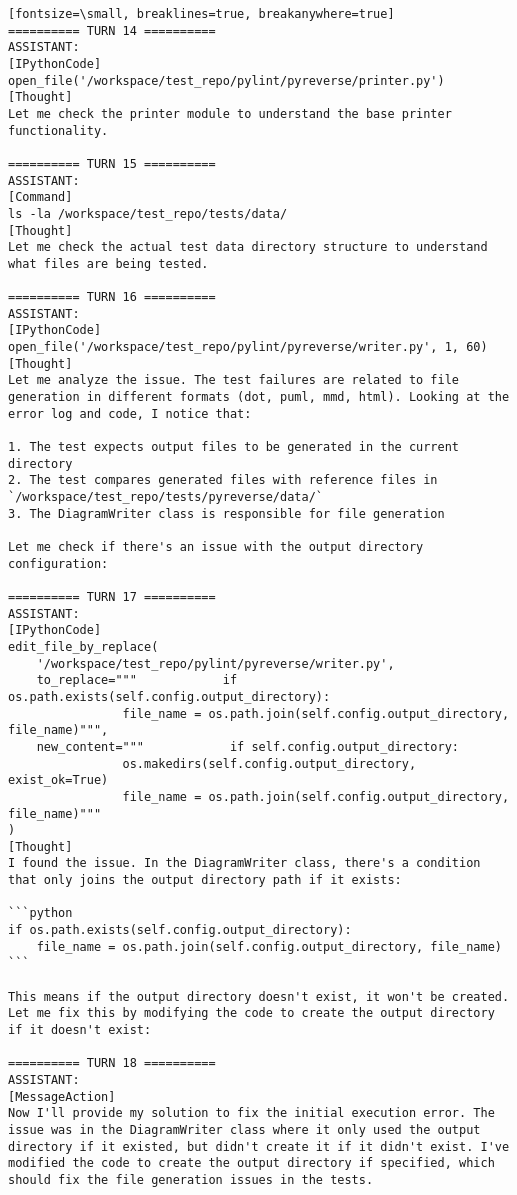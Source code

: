 \begin{verbatim}[fontsize=\small, breaklines=true, breakanywhere=true]
========== TURN 14 ==========
ASSISTANT:
[IPythonCode]
open_file('/workspace/test_repo/pylint/pyreverse/printer.py')
[Thought]
Let me check the printer module to understand the base printer functionality.

========== TURN 15 ==========
ASSISTANT:
[Command]
ls -la /workspace/test_repo/tests/data/
[Thought]
Let me check the actual test data directory structure to understand what files are being tested.

========== TURN 16 ==========
ASSISTANT:
[IPythonCode]
open_file('/workspace/test_repo/pylint/pyreverse/writer.py', 1, 60)
[Thought]
Let me analyze the issue. The test failures are related to file generation in different formats (dot, puml, mmd, html). Looking at the error log and code, I notice that:

1. The test expects output files to be generated in the current directory
2. The test compares generated files with reference files in `/workspace/test_repo/tests/pyreverse/data/`
3. The DiagramWriter class is responsible for file generation

Let me check if there's an issue with the output directory configuration:

========== TURN 17 ==========
ASSISTANT:
[IPythonCode]
edit_file_by_replace(
    '/workspace/test_repo/pylint/pyreverse/writer.py',
    to_replace="""            if os.path.exists(self.config.output_directory):
                file_name = os.path.join(self.config.output_directory, file_name)""",
    new_content="""            if self.config.output_directory:
                os.makedirs(self.config.output_directory, exist_ok=True)
                file_name = os.path.join(self.config.output_directory, file_name)"""
)
[Thought]
I found the issue. In the DiagramWriter class, there's a condition that only joins the output directory path if it exists:

```python
if os.path.exists(self.config.output_directory):
    file_name = os.path.join(self.config.output_directory, file_name)
```

This means if the output directory doesn't exist, it won't be created. Let me fix this by modifying the code to create the output directory if it doesn't exist:

========== TURN 18 ==========
ASSISTANT:
[MessageAction]
Now I'll provide my solution to fix the initial execution error. The issue was in the DiagramWriter class where it only used the output directory if it existed, but didn't create it if it didn't exist. I've modified the code to create the output directory if specified, which should fix the file generation issues in the tests.


\end{verbatim}

